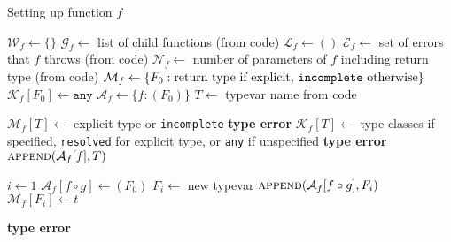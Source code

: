 \documentclass[10pt]{article}
\begin{document}
\begin{algorithm}
	\caption{Setting up function $f$}
	\begin{algorithmic}[1]
		\Statex
			\State $\mathcal{W}_f \gets \{\}$ 
			\State $\mathcal{G}_f \gets $ list of child functions (from code)
			\State $\mathcal{L}_f \gets ()$ 
			\State $\mathcal{E}_f \gets $ set of errors that $f$ throws (from
			code) 
			\State $\mathcal{N}_f \gets $ number of parameters of $f$ including
			return type (from
			code)
			\State $\mathcal{M}_f \gets \{F_0 : \textrm{return type if explicit,
				\texttt{incomplete} otherwise} \}$ 
			\State $\mathcal{K}_f[F_0] \gets \texttt{any}$
			\State $\mathcal{A}_f \gets \{ f : (F_0) \}$ 
				\State $T \gets $ typevar name from code
				 

					\State $\mathcal{M}_f[T] \gets $ explicit type or
						\texttt{incomplete}
						\State \Return \textbf{type error}
					\EndIf
					\State $\mathcal{K}_f[T] \gets $ type classes if
					specified, \texttt{resolved} for explicit type, or
					\texttt{any} if unspecified 
						\State \Return \textbf{type error}
					\EndIf
				\EndIf
				\State $\Call{append}{\mathcal{A}_f[f], T}$ 
			\EndFor

			\State $i \gets 1$ 
					\State $\mathcal{A}_f[f \circ g] \gets (F_0)$
				\EndIf
						\State $F_i \gets $ new typevar
						\State $\Call{append}{\mathcal{A}_f[f \circ g], F_i}$ 
						\State $\mathcal{M}_f[F_i] \gets t$ 

							\State \Return \textbf{type error}
						\EndIf


\end{algorithmic}
\end{algorithm}
\end{document}
